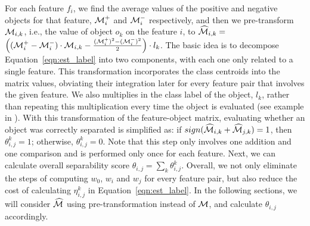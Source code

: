 For each feature $f_i$, we find the average values of the positive and negative objects for that feature, ${\mathcal{M}}_i^+$ and ${\mathcal{M}}_i^-$ respectively, and then we pre-transform ${\mathcal{M}}_{i,k}$, i.e., the value of object $o_k$ on the feature $i$, to $\widehat{{\mathcal{M}}}_{i,k}=$ $\Big( ({\mathcal{M}}_i^+-{\mathcal{M}}_i^-)\cdot {\mathcal{M}}_{i,k}-\frac{({\mathcal{M}}_i^+)^2-({\mathcal{M}}_i^-)^2}{2} \Big) \cdot l_k$.
The basic idea is to decompose
Equation~\ref{eqn:est_label} into two components,
with each one only related to a single feature.
This transformation incorporates
the class centroids into the matrix values,
obviating their integration later
for every feature pair that involves the given feature.
We also multiplies
in the class label of the object, $l_k$,
rather than repeating this multiplication every time the object is evaluated (see example in \transfig). With this transformation of the feature-object matrix,
evaluating whether an object was correctly separated is simplified as: if $sign(\widehat{{\mathcal{M}}}_{i,k} + \widehat{{\mathcal{M}}}_{j,k}) = 1$, then $\theta_{i,j}^{k}=1$; otherwise, $\theta_{i,j}^{k}=0$. 
Note that this step only involves one addition and one comparison and is performed only once for each feature.
Next, we can calculate overall separability score $\theta_{i,j} = \sum_{k}{\theta_{i,j}^{k}}$. Overall,
we not only eliminate the steps of computing
$w_0$, $w_i$ and $w_j$ for every feature pair,
but also reduce the cost of calculating
$\eta_{i,j}^{k}$ in Equation~\ref{eqn:est_label}.
In the following sections,
we will consider $\widehat{{\mathcal{M}}}$ using pre-transformation instead of ${\mathcal{M}}$, and calculate $\theta_{i,j}$ accordingly.


